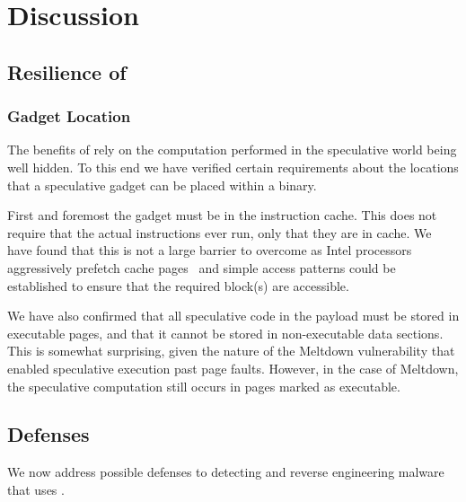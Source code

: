 
\section{Discussion}


\subsection{Resilience of \speculake}

\subsubsection{Gadget Location}
The benefits of \speculake rely on the computation performed in the
speculative world being well hidden. To this end we have verified 
certain requirements about the locations that a speculative gadget can 
be placed within a binary. 

First and foremost the gadget must be in the instruction cache. 
This does not require that the actual instructions ever run,
 only that they are in cache. We have 
found that this is not a large barrier to overcome as Intel 
processors aggressively prefetch cache pages~\cite{measuring-cache}
and simple access patterns could be established to ensure
that the required block(s) are accessible. 

We have also confirmed that all speculative code in the payload must be
stored in executable pages, and that it cannot be stored in non-executable data
sections. This is somewhat surprising, given the nature of the Meltdown
vulnerability that enabled speculative execution past page faults. However, in
the case of Meltdown, the speculative computation still occurs in pages marked
as executable.
\fi




\subsection{Defenses}
We now address possible defenses to detecting and reverse engineering malware
that uses \speculake. 


